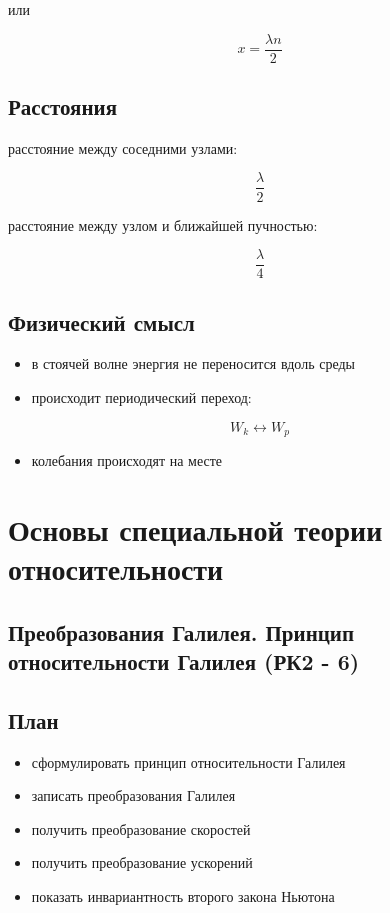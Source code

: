 \documentclass[a4paper,12pt]{article}
\begin{document}
или

\[
x =
\frac{\lambda n}{2}
\]

\subsection*{Расстояния}

расстояние между соседними узлами:

\[
\frac{\lambda}{2}
\]

расстояние между узлом и ближайшей пучностью:

\[
\frac{\lambda}{4}
\]

\subsection*{Физический смысл}

\begin{itemize}
\item в стоячей волне энергия не переносится вдоль среды
\item происходит периодический переход:
\end{itemize}

\[
W_k \leftrightarrow W_p
\]

\begin{itemize}
\item колебания происходят на месте
\end{itemize}

\section{Основы специальной теории относительности}
\subsection{Преобразования Галилея. Принцип относительности Галилея (РК2 - 6)}

\subsection*{План}
\begin{itemize}
\item сформулировать принцип относительности Галилея
\item записать преобразования Галилея
\item получить преобразование скоростей
\item получить преобразование ускорений
\item показать инвариантность второго закона Ньютона
\end{itemize}
\end{document}
